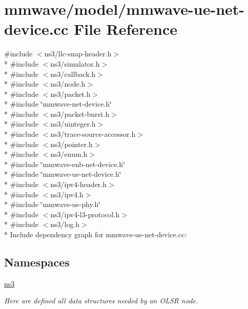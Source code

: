 \hypertarget{mmwave-ue-net-device_8cc}{}\section{mmwave/model/mmwave-\/ue-\/net-\/device.cc File Reference}
\label{mmwave-ue-net-device_8cc}
{\ttfamily \#include $<$ns3/llc-\/snap-\/header.\+h$>$}\\*
{\ttfamily \#include $<$ns3/simulator.\+h$>$}\\*
{\ttfamily \#include $<$ns3/callback.\+h$>$}\\*
{\ttfamily \#include $<$ns3/node.\+h$>$}\\*
{\ttfamily \#include $<$ns3/packet.\+h$>$}\\*
{\ttfamily \#include \char`\"{}mmwave-\/net-\/device.\+h\char`\"{}}\\*
{\ttfamily \#include $<$ns3/packet-\/burst.\+h$>$}\\*
{\ttfamily \#include $<$ns3/uinteger.\+h$>$}\\*
{\ttfamily \#include $<$ns3/trace-\/source-\/accessor.\+h$>$}\\*
{\ttfamily \#include $<$ns3/pointer.\+h$>$}\\*
{\ttfamily \#include $<$ns3/enum.\+h$>$}\\*
{\ttfamily \#include \char`\"{}mmwave-\/enb-\/net-\/device.\+h\char`\"{}}\\*
{\ttfamily \#include \char`\"{}mmwave-\/ue-\/net-\/device.\+h\char`\"{}}\\*
{\ttfamily \#include $<$ns3/ipv4-\/header.\+h$>$}\\*
{\ttfamily \#include $<$ns3/ipv4.\+h$>$}\\*
{\ttfamily \#include \char`\"{}mmwave-\/ue-\/phy.\+h\char`\"{}}\\*
{\ttfamily \#include $<$ns3/ipv4-\/l3-\/protocol.\+h$>$}\\*
{\ttfamily \#include $<$ns3/log.\+h$>$}\\*
Include dependency graph for mmwave-\/ue-\/net-\/device.cc\+:
\subsection*{Namespaces}
\begin{DoxyCompactItemize}
\item 
 \hyperlink{namespacens3}{ns3}
\begin{DoxyCompactList}\small\item\em Here are defined all data structures needed by an O\+L\+SR node. \end{DoxyCompactList}\end{DoxyCompactItemize}
